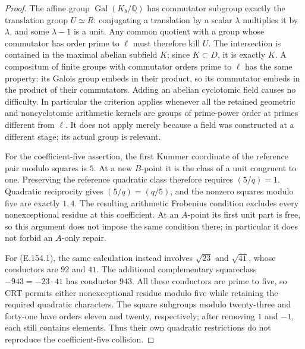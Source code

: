 \begin{proof}
The affine group \(\operatorname{Gal}(K_b/\mathbb Q)\)
has commutator subgroup exactly the translation group
\(U\simeq R\): conjugating a translation by a scalar
\(\lambda\) multiplies it by \(\lambda\), and some
\(\lambda-1\) is a unit. Any common quotient with a group
whose commutator has order prime to \(\ell\) must therefore
kill \(U\). The intersection is contained in the maximal
abelian subfield \(K\); since \(K\subset D\), it is exactly
\(K\). A compositum of finite groups with commutator orders
prime to \(\ell\) has the same property: its Galois group
embeds in their product, so its commutator embeds in the product
of their commutators. Adding an abelian cyclotomic field causes
no difficulty. In particular the criterion applies whenever
all the retained geometric and noncyclotomic arithmetic kernels
are groups of prime-power order at primes different from
\(\ell\). It does not apply merely because a field was
constructed at a different stage; its actual group is relevant.

For the coefficient-five assertion, the first Kummer coordinate
of the reference pair modulo squares is \(5\). At a new
\(B\)-point it is the class of a unit congruent to one.
Preserving the reference quadratic class therefore requires \((5/q)=1\).
Quadratic reciprocity gives \((5/q)=(q/5)\), and the nonzero
squares modulo five are exactly \(1,4\). The resulting
arithmetic Frobenius condition excludes every nonexceptional
residue at this coefficient. At an \(A\)-point its first unit
part is free, so this argument does not impose the same condition
there; in particular it does not forbid an \(A\)-only repair.

For (E.154.1), the same calculation instead involves
\(\sqrt{23}\) and \(\sqrt{41}\), whose conductors are
\(92\) and \(41\). The additional complementary squareclass
\(-943=-23\cdot41\) has conductor \(943\).
All these conductors are prime to five, so CRT permits either
nonexceptional residue modulo five while retaining the required
quadratic characters. The square subgroups modulo twenty-three
and forty-one have orders eleven and twenty, respectively;
after removing \(1\) and \(-1\), each still contains elements.
Thus their own quadratic restrictions do not reproduce the
coefficient-five collision.


\end{proof}
